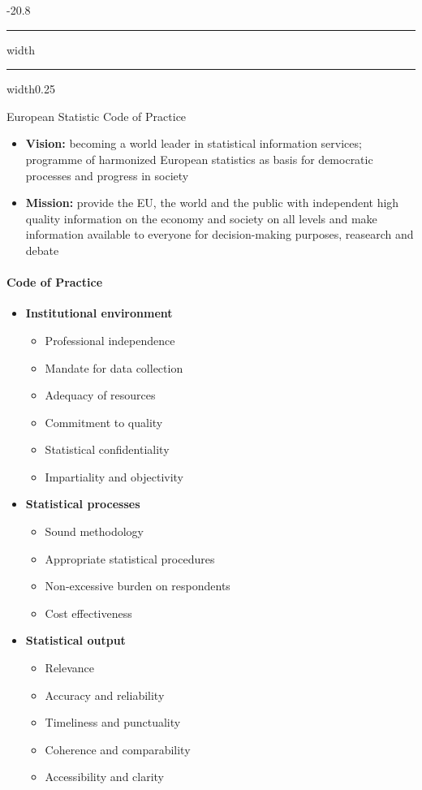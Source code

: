 \documentclass[a4paper, landscape, 6pt, fleqn]{scrartcl}
\makeatletter
\renewcommand{\emph}[1]{\textbf{#1}}
\renewcommand{\subsection}{\@startsection{subsection}{1}{0mm}%
{-2\baselineskip}{0.8\baselineskip}%
{\hrule depth 0.2pt width\columnwidth\hrule depth0.75pt
width0.25\columnwidth\vspace*{1.2em}\large\bfseries}}
\makeatother
\begin{document}
\begin{multicols*}{4}
\subsection{European Statistic Code of Practice}

\begin{itemize}
\item \emph{Vision:} becoming a world leader in statistical information services; programme of harmonized European statistics as basis for democratic processes and progress in society
\item \emph{Mission:} provide the EU, the world and the public with independent high quality information on the economy and society on all levels and make information available to everyone for decision-making purposes, reasearch and debate
\end{itemize}

\paragraph{Code of Practice}

\begin{itemize}
\item \emph{Institutional environment}
\begin{itemize}
\item Professional independence
\item Mandate for data collection
\item Adequacy of resources
\item Commitment to quality
\item Statistical confidentiality
\item Impartiality and objectivity
\end{itemize}
\item \emph{Statistical processes}
\begin{itemize}
\item Sound methodology
\item Appropriate statistical procedures
\item Non-excessive burden on respondents
\item Cost effectiveness
\end{itemize}
\item \emph{Statistical output}
\begin{itemize}
\item Relevance
\item Accuracy and reliability
\item Timeliness and punctuality
\item Coherence and comparability
\item Accessibility and clarity
\end{itemize}
\end{itemize}


\end{multicols*}
\end{document}

